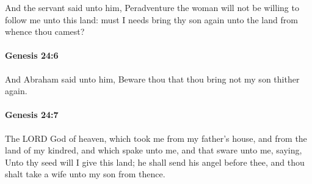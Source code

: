 			And the servant said unto him, Peradventure the woman will not be willing to follow me unto this land: must I needs bring thy son again unto the land from whence thou camest?


		\paragraph{Genesis 24:6} %
			\label{GENESIS-24-6}

			And Abraham said unto him, Beware thou that thou bring not my son thither again.


		\paragraph{Genesis 24:7} %
			\label{GENESIS-24-7}

			The LORD God of heaven, which took me from my father's house, and from the land of my kindred, and which spake unto me, and that sware unto me, saying, Unto thy seed will I give this land; he shall send his angel before thee, and thou shalt take a wife unto my son from thence.


